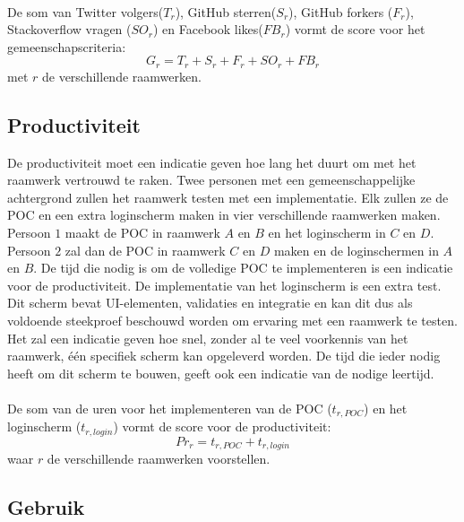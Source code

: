 \paragraph{}
De som van Twitter volgers($T_r$), GitHub sterren($S_r$), GitHub forkers ($F_r$), Stackoverflow vragen ($SO_r$) en Facebook likes($FB_r$) vormt de score voor het gemeenschapscriteria:
\begin{equation}
  G_r=T_r+S_r+F_r+SO_r+FB_r
  \label{eq:gemeenschap}
\end{equation}
met $r$ de verschillende raamwerken.

\subsection{Productiviteit}
\label{sec:vergelijking-productiviteit}
De productiviteit moet een indicatie geven hoe lang het duurt om met het raamwerk vertrouwd te raken. 
Twee personen met een gemeenschappelijke achtergrond zullen het raamwerk testen met een implementatie.
Elk zullen ze de POC en een extra loginscherm maken in vier verschillende raamwerken maken.
Persoon $1$ maakt de POC in raamwerk $A$ en $B$ en het loginscherm in $C$ en $D$.
Persoon $2$ zal dan de POC in raamwerk $C$ en $D$ maken en de loginschermen in $A$ en $B$.
De tijd die nodig is om de volledige POC te implementeren is een indicatie voor de productiviteit. 
De implementatie van het loginscherm is een extra test.
Dit scherm bevat UI-elementen, validaties en  integratie en kan dit dus als voldoende steekproef beschouwd worden om ervaring met een raamwerk te testen.
Het zal een indicatie geven hoe snel,  zonder al te veel voorkennis van het raamwerk,  één specifiek scherm kan opgeleverd worden.
De tijd die ieder nodig heeft om dit scherm te bouwen, geeft ook een indicatie van de nodige leertijd.
\paragraph{}
De som van de uren voor het implementeren van de POC ($t_{r,POC}$) en het loginscherm ($t_{r,login}$) vormt de score voor de productiviteit:
\begin{equation}
  Pr_r = {t_{r,POC} + t_{r,login}}
  \label{eq:productiviteit}
\end{equation}
waar $r$ de verschillende raamwerken voorstellen.

\subsection{Gebruik}
\label{sec:vergelijking-gebruik}

